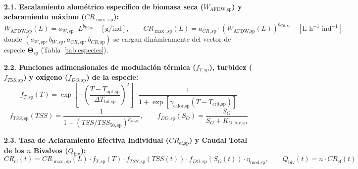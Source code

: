\documentclass[11pt,letterpaper]{article}
\begin{document}
\begin{formulabox}
\textbf{2.1. Escalamiento alométrico específico de biomasa seca ($W_{\text{AFDW,sp}}$) y aclaramiento máximo ($CR_{\max,\text{sp}}$):}
\begin{equation}
W_{\text{AFDW,sp}}(L) = a_{W,\text{sp}} \cdot L^{b_{W,\text{sp}}} \quad [\text{g/ind}], \qquad CR_{\max,\text{sp}}(L) = a_{CR,\text{sp}} \cdot \left(W_{\text{AFDW,sp}}(L)\right)^{b_{CR,\text{sp}}} \quad [\text{L h}^{-1}\text{ ind}^{-1}]
\label{eq:crmax}
\end{equation}
donde $(a_{W,\text{sp}}, b_{W,\text{sp}}, a_{CR,\text{sp}}, b_{CR,\text{sp}})$ se cargan dinámicamente del vector de especie $\boldsymbol{\Theta}_{\text{sp}}$ (Tabla~\ref{tab:especies}).

\textbf{2.2. Funciones adimensionales de modulación térmica ($f_{T,\text{sp}}$), turbidez ($f_{TSS,\text{sp}}$) y oxígeno ($f_{DO,\text{sp}}$) de la especie:}
\begin{equation}
f_{T,\text{sp}}(T) = \exp\!\left[-\left(\frac{T - T_{\text{opt,sp}}}{\Delta T_{\text{tol,sp}}}\right)^2\right] \cdot \frac{1}{1 + \exp\!\left[\gamma_{\text{calor,sp}}(T - T_{\text{crit,sp}})\right]}
\label{eq:ft}
\end{equation}
\begin{equation}
f_{TSS,\text{sp}}(TSS) = \frac{1}{1 + \left(TSS / TSS_{50,\text{sp}}\right)^{p_{\text{sat,sp}}}}, \qquad f_{DO,\text{sp}}(S_O) = \frac{S_O}{S_O + K_{O,\text{biv,sp}}}
\label{eq:ftss}
\end{equation}

\textbf{2.3. Tasa de Aclaramiento Efectiva Individual ($CR_{\text{ef,sp}}$) y Caudal Total de los $n$ Bivalvos ($Q_{\text{biv}}$):}
\begin{equation}
CR_{\text{ef}}(t) = CR_{\max,\text{sp}}(L) \cdot f_{T,\text{sp}}(T) \cdot f_{TSS,\text{sp}}\!\left(TSS(t)\right) \cdot f_{DO,\text{sp}}\!\left(S_O(t)\right) \cdot \eta_{\text{mod,sp}}, \qquad Q_{\text{biv}}(t) = n \cdot CR_{\text{ef}}(t)
\label{eq:cref}
\end{equation}
\end{formulabox}
\end{document}
